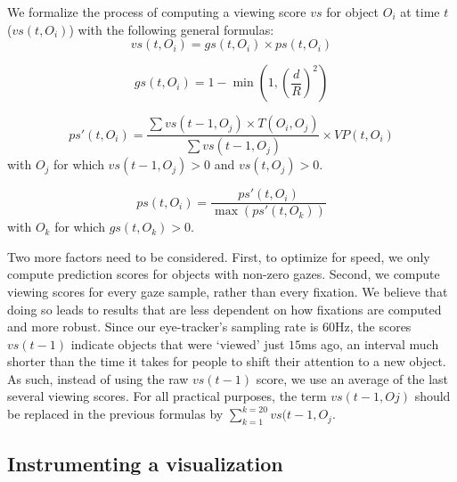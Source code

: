 We formalize the process of computing a viewing score $vs$ for object $O_i$ at time $t$  ($vs(t,O_i)$) with the following general formulas:
\begin{equation}
vs(t, O_i) = gs(t, O_i) \times ps(t, O_i)
\label{eq:VS}
\end{equation}

\begin{equation}
gs(t, O_i) = 1 - \min{(1, (\frac{d}{R})^2)}
\label{eq:GS}
\end{equation}

\begin{equation}
ps'(t, O_i) = \frac{\sum{vs(t-1, O_j)} \times T(O_i,O_j)}{\sum{vs(t-1, O_j)}} \times VP(t, O_i)
\label{eq:PSDash}
\end{equation}
with $O_j$ for which $vs(t-1, O_j) > 0$ and $vs(t, O_j) > 0$.

\begin{equation}
ps(t,O_i) = \frac{ps'(t, O_i)}{\max (ps'(t, O_k))}
\label{eq:PS}
\end{equation}
with $O_k$ for which $gs(t,O_k) >0$.

Two more factors need to be considered. First, to optimize for speed, we only compute prediction scores for objects with non-zero gazes. Second, we compute viewing scores for every gaze sample, rather than every fixation. We believe that doing so leads to results that are less dependent on how fixations are computed and more robust. Since our eye-tracker's sampling rate is $60$Hz, the scores $vs(t-1)$ indicate objects that were `viewed' just $15$ms ago, an interval much shorter than the time it takes for people to shift their attention to a new object. As such, instead of using the raw $vs(t-1)$ score, we use an average of the last several viewing scores. For all practical purposes, the term $vs(t-1,Oj)$ should be replaced in the previous formulas by $ \sum_{k=1}^{k=20}{vs(t-1, O_j}$.


\subsection{Instrumenting a visualization}

